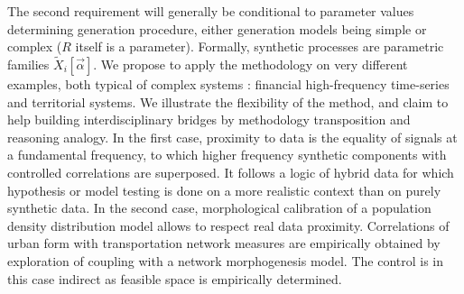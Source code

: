 The second requirement will generally be conditional to parameter values determining generation procedure, either generation models being simple or complex ($R$ itself is a parameter). Formally, synthetic processes are parametric families $\tilde{X}_i[\vec{\alpha}]$. %
We propose to apply the methodology on very different examples, both typical of complex systems : financial high-frequency time-series and territorial systems. We illustrate the flexibility of the method, and claim to help building interdisciplinary bridges by methodology transposition and reasoning analogy. In the first case, proximity to data is the equality of signals at a fundamental frequency, to which higher frequency synthetic components with controlled correlations are superposed. It follows a logic of hybrid data for which hypothesis or model testing is done on a more realistic context than on purely synthetic data. In the second case, morphological calibration of a population density distribution model allows to respect real data proximity. Correlations of urban form with transportation network measures are empirically obtained by exploration of coupling with a network morphogenesis model. The control is in this case indirect as feasible space is empirically determined.


